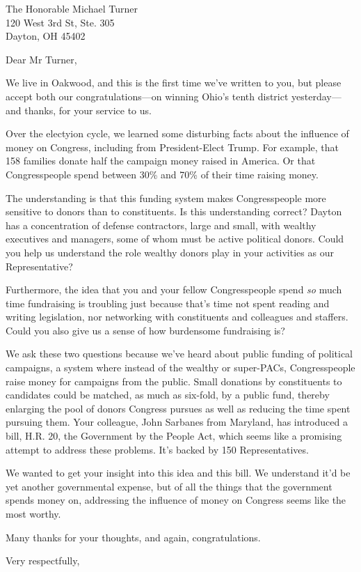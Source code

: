 \documentclass{letter}
\begin{document}
\begin{letter}{
  The Honorable Michael Turner \\
  120 West 3rd St, Ste. 305 \\
  Dayton, OH 45402}

\opening{Dear Mr Turner,}

We live in Oakwood, and this is the first time we've written to you, but please
accept both our congratulations---on winning Ohio's tenth district
yesterday---and thanks, for your service to us.

Over the electyion cycle, we learned some disturbing facts about the influence
of money on Congress, including from President-Elect Trump. For example, that
158 families donate half the campaign money raised in America. Or that
Congresspeople spend between 30\% and 70\% of their time raising money.

The understanding is that this funding system makes Congresspeople more
sensitive to donors than to constituents. Is this understanding correct? Dayton
has a concentration of defense contractors, large and small, with wealthy
executives and managers, some of whom must be active political donors. Could you
help us understand the role wealthy donors play in your activities as our
Representative?

Furthermore, the idea that you and your fellow Congresspeople spend {\em so}
much time fundraising is troubling just because that's time not spent reading
and writing legislation, nor networking with constituents and colleagues and
staffers. Could you also give us a sense of how burdensome fundraising is?

We ask these two questions because we've heard about public funding of political
campaigns, a system where instead of the wealthy or super-PACs, Congresspeople
raise money for campaigns from the public. Small donations by constituents to
candidates could be matched, as much as six-fold, by a public fund, thereby
enlarging the pool of donors Congress pursues as well as reducing the time spent
pursuing them. Your colleague, John Sarbanes from Maryland, has introduced a
bill, H.R. 20, the Government by the People Act, which seems like a promising
attempt to address these problems. It's backed by 150 Representatives.

We wanted to get your insight into this idea and this bill. We understand it'd
be yet another governmental expense, but of all the things that the government
spends money on, addressing the influence of money on Congress seems like the
most worthy.

Many thanks for your thoughts, and again, congratulations.

\closing{Very respectfully,}


\end{letter}
\end{document}
